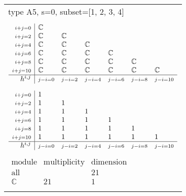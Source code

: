 \documentclass[crop,border=2mm]{standalone}
\begin{document}
\begin{tabular}{l}
{\huge type A5, s=0, subset=[1, 2, 3, 4]}\\ \\


$\displaystyle
\begin{array}{r|l l l l l l}
	{\scriptstyle i+j=0}&\mathbb{C}&&&&&\\
	{\scriptstyle i+j=2}&\mathbb{C}&\mathbb{C}&&&&\\
	{\scriptstyle i+j=4}&\mathbb{C}&\mathbb{C}&\mathbb{C}&&&\\
	{\scriptstyle i+j=6}&\mathbb{C}&\mathbb{C}&\mathbb{C}&\mathbb{C}&&\\
	{\scriptstyle i+j=8}&\mathbb{C}&\mathbb{C}&\mathbb{C}&\mathbb{C}&\mathbb{C}&\\
	{\scriptstyle i+j=10}&\mathbb{C}&\mathbb{C}&\mathbb{C}&\mathbb{C}&\mathbb{C}&\mathbb{C}\\
	\hline h^{i,j}&{\scriptstyle j-i=0}&{\scriptstyle j-i=2}&{\scriptstyle j-i=4}&{\scriptstyle j-i=6}&{\scriptstyle j-i=8}&{\scriptstyle j-i=10}
\end{array}
$ \\ \\


$\displaystyle
\begin{array}{r|l l l l l l}
	{\scriptstyle i+j=0}&1&&&&&\\
	{\scriptstyle i+j=2}&1&1&&&&\\
	{\scriptstyle i+j=4}&1&1&1&&&\\
	{\scriptstyle i+j=6}&1&1&1&1&&\\
	{\scriptstyle i+j=8}&1&1&1&1&1&\\
	{\scriptstyle i+j=10}&1&1&1&1&1&1\\
	\hline h^{i,j}&{\scriptstyle j-i=0}&{\scriptstyle j-i=2}&{\scriptstyle j-i=4}&{\scriptstyle j-i=6}&{\scriptstyle j-i=8}&{\scriptstyle j-i=10}
\end{array}
$ \\ \\


$\displaystyle
\begin{array}{rll}
	\text{module}&\text{multiplicity}&\text{dimension} \\ \hline \text{all}&&21 \\
	\mathbb{C}&21&1
\end{array}
$ \\ \\

\end{tabular}
\end{document}
